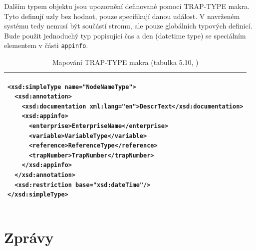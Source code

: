 Dalším typem objektu jsou upozornění definované pomocí TRAP-TYPE makra. Tyto definují uzly bez hodnot, pouze specifikují danou událost. V navrženém systému
tedy nemusí být součástí stromu, ale pouze globálních typových definicí. Bude použit jednoduchý typ popisující čas a den (datetime type) se speciálním elementem
v části \verb|appinfo|.

\begin{table}
	\centering
	{\footnotesize
	  \begin{tabular}{|p{15cm}|}
      \hline
\begin{verbatim}<xsd:simpleType name="NodeNameType">
  <xsd:annotation>
    <xsd:documentation xml:lang="en">DescrText</xsd:documentation>
    <xsd:appinfo>
      <enterprise>EnterpriseName</enterprise>
      <variable>VariableType</variable>
      <reference>ReferenceType</reference>
      <trapNumber>TrapNumber</trapNumber>
    </xsd:appinfo>
  </xsd:annotation>
  <xsd:restriction base="xsd:dateTime"/>
</xsd:simpleType>\end{verbatim}\\
      \hline
    \end{tabular}
  }
	\caption{Mapování TRAP-TYPE makra (tabulka 5.10, \cite{macejko_dipl})}
	\label{tab_xml_trap_type}
\end{table}

\newpage

\section{Zprávy}


